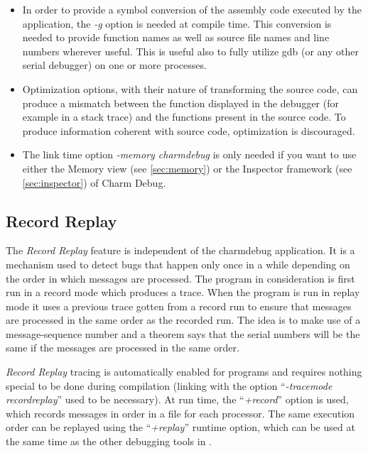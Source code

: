 \documentclass[10pt]{article}
\begin{document}
\begin{itemize}

\item In order to provide a symbol conversion of the assembly code executed
by the application, the \textit{-g} option is needed at compile time. This
conversion is needed to provide function names as well as source file names
and line numbers wherever useful. This is useful also to fully utilize gdb
(or any other serial debugger) on one or more processes.

\item Optimization options, with their nature of transforming the source code,
can produce a mismatch between the function displayed in the debugger (for
example in a stack trace) and the functions present in the source code. To
produce information coherent with source code, optimization is discouraged.

\item The link time option \textit{-memory charmdebug} is only needed if
you want to use either the Memory view (see \ref{sec:memory}) or the Inspector
framework (see \ref{sec:inspector}) of Charm Debug.

\end{itemize}

\subsection{Record Replay}

The \textit{Record Replay} feature is independent of the charmdebug
application.  It is a mechanism used to detect bugs that happen only
once in a while depending on the order in which messages are
processed. The program in consideration is first run in a record mode
which produces a trace. When the program is run in replay mode it uses
a previous trace gotten from a record run to ensure that messages are
processed in the same order as the recorded run. The idea is to make
use of a message-sequence number and a theorem says that the serial
numbers will be the same if the messages are processed in the same
order. \cite{rashmithesis}

\textit{Record Replay} tracing is automatically enabled for \charmpp{}
programs and requires nothing special to be done during compilation
(linking with the option ``\textit{-tracemode recordreplay}'' used to
be necessary).  At run time, the ``\textit{+record}'' option is used,
which records messages in order in a file for each processor.  The
same execution order can be replayed using the ``\textit{+replay}''
runtime option, which can be used at the same time as the other
debugging tools in \charmpp{}.
\end{document}
